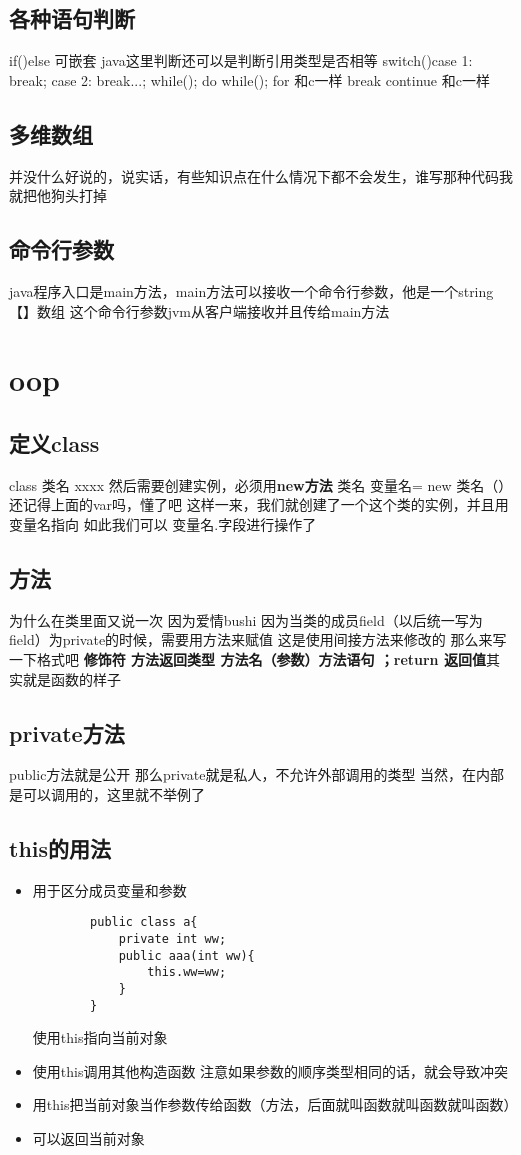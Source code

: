 \documentclass[a4paper,12pt]{ctexbook}
\begin{document}
\subsection{各种语句判断}
if(){}else 可嵌套 java这里判断还可以是判断引用类型是否相等
switch(){case 1: break; case 2: break...};
while(){}; do{} while(); for 和c一样
break continue 和c一样
\subsection{多维数组}
并没什么好说的，说实话，有些知识点在什么情况下都不会发生，谁写那种代码我就把他狗头打掉
\subsection{命令行参数}
java程序入口是main方法，main方法可以接收一个命令行参数，他是一个string【】数组
这个命令行参数jvm从客户端接收并且传给main方法
\section{oop}
\subsection{定义class}
class 类名{
    xxxx
}
然后需要创建实例，必须用\textbf{new方法}
类名 变量名= new 类名（） 还记得上面的var吗，懂了吧
这样一来，我们就创建了一个这个类的实例，并且用变量名指向
如此我们可以 变量名.字段进行操作了
\subsection{方法}
为什么在类里面又说一次
因为爱情bushi  因为当类的成员field（以后统一写为field）为private的时候，需要用方法来赋值
这是使用间接方法来修改的
那么来写一下格式吧
\textbf{修饰符 方法返回类型 方法名（参数）{方法语句 ；return 返回值}}其实就是函数的样子
\subsection{private方法}
public方法就是公开 那么private就是私人，不允许外部调用的类型
当然，在内部是可以调用的，这里就不举例了
\subsection{this的用法}
\begin{itemize}
    \item 用于区分成员变量和参数\begin{lstlisting}
        public class a{
            private int ww;
            public aaa(int ww){
                this.ww=ww;
            }
        }
    \end{lstlisting}使用this指向当前对象
    \item 使用this调用其他构造函数 注意如果参数的顺序类型相同的话，就会导致冲突
    \item 用this把当前对象当作参数传给函数（方法，后面就叫函数就叫函数就叫函数）
    \item 可以返回当前对象
\end{itemize}
\end{document}
